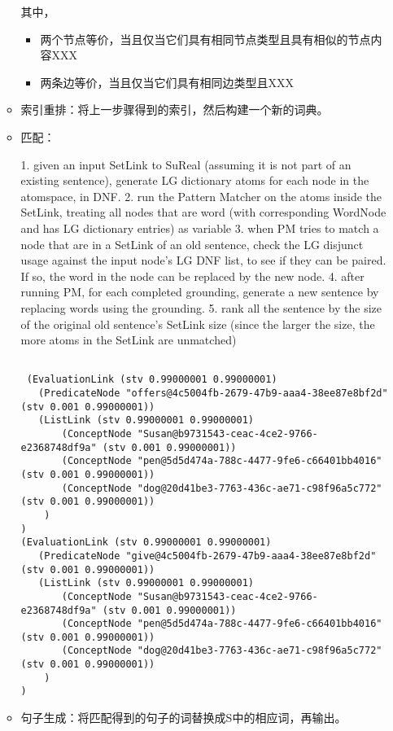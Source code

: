 \begin{itemize}
\begin{itemize}
\noindent 其中，
\begin{itemize}

\item 两个节点等价，当且仅当它们具有相同节点类型且具有相似的节点内容XXX

\item 两条边等价，当且仅当它们具有相同边类型且XXX

\end{itemize}

\item 索引重排：将上一步骤得到的索引，然后构建一个新的词典。

\item 匹配：

1. given an input SetLink to SuReal (assuming it is not part of an existing sentence), generate LG dictionary atoms for each node in the atomspace, in DNF.
2. run the Pattern Matcher on the atoms inside the SetLink, treating all nodes that are word (with corresponding WordNode and has LG dictionary entries) as variable
3. when PM tries to match a node that are in a SetLink of an old sentence, check the LG disjunct usage against the input node's LG DNF list, to see if they can be paired.  If so, the word in the node can be replaced by the new node.
4. after running PM, for each completed grounding, generate a new sentence by replacing words using the grounding.
5. rank all the sentence by the size of the original old sentence's SetLink size (since the larger the size, the more atoms in the SetLink are unmatched)

\begin{verbatim}

 (EvaluationLink (stv 0.99000001 0.99000001)
   (PredicateNode "offers@4c5004fb-2679-47b9-aaa4-38ee87e8bf2d" (stv 0.001 0.99000001))
   (ListLink (stv 0.99000001 0.99000001)
       (ConceptNode "Susan@b9731543-ceac-4ce2-9766-e2368748df9a" (stv 0.001 0.99000001))
       (ConceptNode "pen@5d5d474a-788c-4477-9fe6-c66401bb4016" (stv 0.001 0.99000001))
       (ConceptNode "dog@20d41be3-7763-436c-ae71-c98f96a5c772" (stv 0.001 0.99000001))
    )
)
(EvaluationLink (stv 0.99000001 0.99000001)
   (PredicateNode "give@4c5004fb-2679-47b9-aaa4-38ee87e8bf2d" (stv 0.001 0.99000001))
   (ListLink (stv 0.99000001 0.99000001)
       (ConceptNode "Susan@b9731543-ceac-4ce2-9766-e2368748df9a" (stv 0.001 0.99000001))
       (ConceptNode "pen@5d5d474a-788c-4477-9fe6-c66401bb4016" (stv 0.001 0.99000001))
       (ConceptNode "dog@20d41be3-7763-436c-ae71-c98f96a5c772" (stv 0.001 0.99000001))
    )
) 

\end{verbatim}

\item 句子生成：将匹配得到的句子的词替换成S中的相应词，再输出。


\end{itemize}

\end{itemize}



